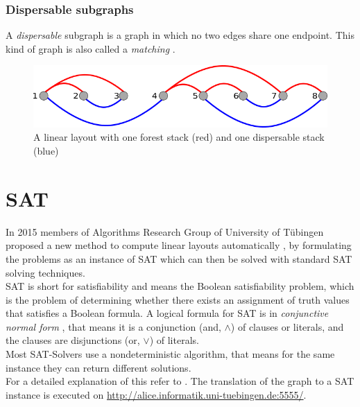 \subsubsection{Dispersable subgraphs}
A \textit{dispersable} subgraph is a graph in which no two edges share one endpoint. This kind of graph is also called a \textit{matching} \cite{kaufmann2018dispersable}. 
\begin{figure}[h!]
\begin{center}
\includegraphics[width=1\textwidth]{figures/ForestDisp.png}
\caption{A linear layout with one forest stack (red) and one dispersable stack (blue)}
\label{img:layoutForestDisp}
\end{center}
\end{figure} 
\section{SAT}
\label{SAT}
In 2015 members of Algorithms Research Group of University of Tübingen proposed a new method to compute linear layouts automatically \cite{Bekos2015TheBE}, by formulating the problems as an instance of SAT which can then be solved with standard SAT solving techniques.\\
SAT  is short for satisfiability and means the Boolean satisfiability problem, which is the problem of determining whether there exists an assignment of truth values that satisfies a Boolean formula.
A logical formula for SAT is in \textit{conjunctive normal form} , that means it is a conjunction (and, $\land$) of clauses or literals, and the clauses are disjunctions (or, $\lor$) of literals.\\
Most SAT-Solvers use a nondeterministic algorithm, that means for the same instance they can return different solutions.\\
For a detailed explanation of this refer to \cite{Bekos2015TheBE, jess}. The translation of the graph to a SAT instance is executed on \url{
http://alice.informatik.uni-tuebingen.de:5555/}.
